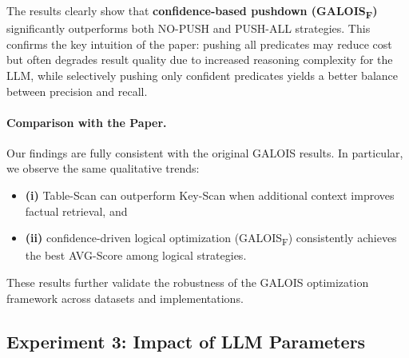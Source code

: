 \begin{table}[ht]
    \centering
    \caption{Logical optimization results on GEO with fixed Table-Scan.}
    \label{tab:exp2-logical}
\end{table}

The results clearly show that \textbf{confidence-based pushdown (\textsc{GALOIS\textsubscript{F}})} significantly outperforms both NO-PUSH and PUSH-ALL strategies.
This confirms the key intuition of the paper: pushing all predicates may reduce cost but often degrades result quality due to increased reasoning complexity for the LLM, while selectively pushing only confident predicates yields a better balance between precision and recall.

\paragraph{Comparison with the Paper.}
Our findings are fully consistent with the original GALOIS results.
In particular, we observe the same qualitative trends:
\begin{itemize}
\item \textbf{(i)} Table-Scan can outperform Key-Scan when additional context improves factual retrieval, and
\item \textbf{(ii)} confidence-driven logical optimization (\textsc{GALOIS\textsubscript{F}}) consistently achieves the best AVG-Score among logical strategies.
\end{itemize}
These results further validate the robustness of the GALOIS optimization framework across datasets and implementations.


\subsection{Experiment 3: Impact of LLM Parameters}

